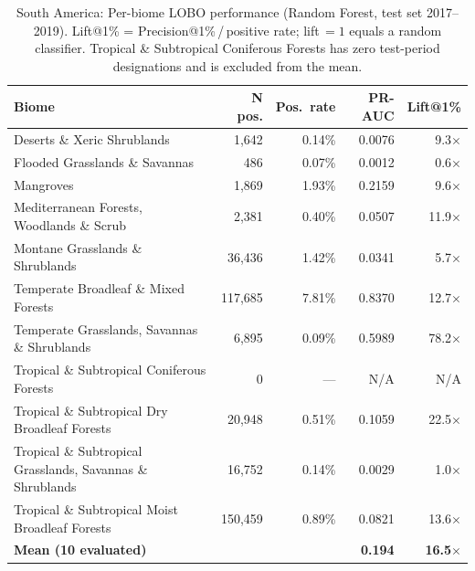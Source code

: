 \documentclass[12pt]{article}
\theoremstyle{break}
\begin{document}
\begin{appendices}
\begin{table}[!htbp]
\centering\small
\caption{South America: Per-biome LOBO performance (Random Forest, test set 2017--2019).
Lift@1\% = Precision@1\%\,/\,positive rate; lift\,$=1$ equals a random classifier.
Tropical \& Subtropical Coniferous Forests has zero test-period designations and is
excluded from the mean.}
\label{tab:lobo_sa}
\begin{tabular}{p{7cm}rrrr}
\toprule
\textbf{Biome} & \textbf{N pos.} & \textbf{Pos.\ rate} & \textbf{PR-AUC} & \textbf{Lift@1\%} \\
\midrule
Deserts \& Xeric Shrublands                         &   1{,}642 & 0.14\% & 0.0076         &   9.3$\times$ \\
Flooded Grasslands \& Savannas                      &     486   & 0.07\% & 0.0012         &   0.6$\times$ \\
Mangroves                                           &   1{,}869 & 1.93\% & 0.2159         &   9.6$\times$ \\
Mediterranean Forests, Woodlands \& Scrub           &   2{,}381 & 0.40\% & 0.0507         &  11.9$\times$ \\
Montane Grasslands \& Shrublands                    &  36{,}436 & 1.42\% & 0.0341         &   5.7$\times$ \\
Temperate Broadleaf \& Mixed Forests                & 117{,}685 & 7.81\% & 0.8370         &  12.7$\times$ \\
Temperate Grasslands, Savannas \& Shrublands        &   6{,}895 & 0.09\% & 0.5989         &  78.2$\times$ \\
Tropical \& Subtropical Coniferous Forests          &         0 &    --- & N/A            & N/A           \\
Tropical \& Subtropical Dry Broadleaf Forests       &  20{,}948 & 0.51\% & 0.1059         &  22.5$\times$ \\
Tropical \& Subtropical Grasslands, Savannas \& Shrublands &  16{,}752 & 0.14\% & 0.0029 &   1.0$\times$ \\
Tropical \& Subtropical Moist Broadleaf Forests     & 150{,}459 & 0.89\% & 0.0821         &  13.6$\times$ \\
\midrule
\textbf{Mean (10 evaluated)}                        &           &        & \textbf{0.194} & \textbf{16.5$\times$} \\
\bottomrule
\end{tabular}
\end{table}


\end{appendices}
\end{document}
